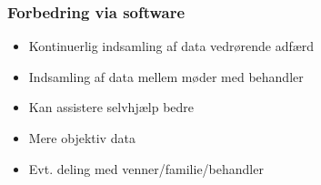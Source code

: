\begin{frame}
\frametitle{Forbedring via software}

\begin{itemize}
\item Kontinuerlig indsamling af data vedrørende adfærd
\item Indsamling af data mellem møder med behandler
\item Kan assistere selvhjælp bedre
\item Mere objektiv data
\item Evt. deling med venner/familie/behandler
\end{itemize}

\end{frame}
